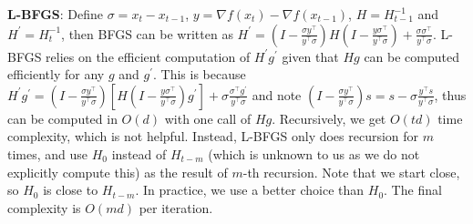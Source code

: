\textbf{L-BFGS}: Define $\sigma = x_t - x_{t-1}$, $y = \nabla f(x_t) - \nabla f(x_{t-1})$, $H = H_{t-1}^{-1}$ and $H^\prime = H_t^{-1}$, then BFGS can be written as $ H^\prime = (I-\frac{\sigma y^\top}{y^\top \sigma}) H (I-\frac{ y \sigma^\top}{y^\top \sigma}) + \frac{\sigma \sigma^\top}{y^\top \sigma}$. L-BFGS relies on the efficient computation of $H^\prime g^\prime$ given that $H g$ can be computed efficiently for any $g$ and $g^\prime$. This is because $H^\prime g^\prime = (I-\frac{\sigma y^\top}{y^\top \sigma}) \left[H (I-\frac{ y \sigma^\top}{y^\top \sigma}) g^\prime\right] + \sigma \frac{\sigma^\top g^\prime}{y^\top \sigma}$ and note $(I-\frac{\sigma y^\top}{y^\top \sigma}) s = s - \sigma \frac{y^\top s}{y^\top \sigma}$, thus can be computed in $O(d)$ with one call of $Hg$. Recursively, we get $O(td)$ time complexity, which is not helpful. Instead, L-BFGS only does recursion for $m$ times, and use $H_0$ instead of $H_{t-m}$ (which is unknown to us as we do not explicitly compute this) as the result of $m$-th recursion. Note that we start close, so $H_0$ is close to $H_{t-m}$. In practice, we use a better choice than $H_0$.  The final complexity is $O(md)$ per iteration.